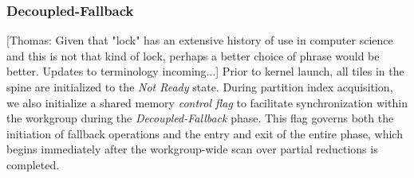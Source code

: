 \documentclass[sigconf]{acmart}
\newcommand{\thomas}[1]{{\footnotesize\color{orange}[Thomas: #1]}}
\begin{document}
\subsubsection{Decoupled-Fallback}
\thomas{Given that "lock" has an extensive history of use in computer science and this is not that kind of lock, perhaps a better choice of phrase would be better. Updates to terminology incoming...}
Prior to kernel launch, all tiles in the spine are initialized to the \emph{Not Ready} state. During partition index acquisition, we also initialize a shared memory \emph{control flag} to facilitate synchronization within the workgroup during the \emph{Decoupled-Fallback} phase. This flag governs both the initiation of fallback operations and the entry and exit of the entire phase, which begins immediately after the workgroup-wide scan over partial reductions is completed.
\end{document}
